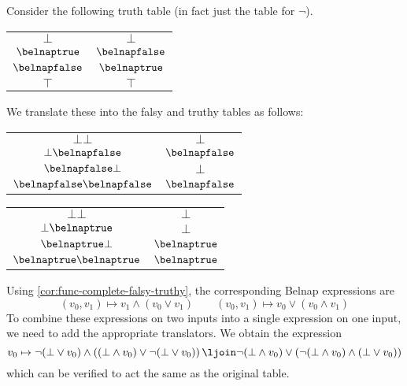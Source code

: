 \begin{example}
    Consider the following truth table (in fact just the table for \(\neg\)).
    \begin{center}
        \begin{tabular}{c|c}
            \(\bot\)         & \(\bot\)         \\
            \(\belnaptrue\)  & \(\belnapfalse\) \\
            \(\belnapfalse\) & \(\belnaptrue\)  \\
            \(\top\)         & \(\top\)
        \end{tabular}
    \end{center}
    We translate these into the falsy and truthy tables as follows:
    \begin{center}
        \begin{tabular}{c|c}
            \(\bot\bot\)                 & \(\bot\)         \\
            \(\bot\belnapfalse\)         & \(\belnapfalse\) \\
            \(\belnapfalse\bot\)         & \(\bot\)         \\
            \(\belnapfalse\belnapfalse\) & \(\belnapfalse\)
        \end{tabular}
        \begin{tabular}{c|c}
            \(\bot\bot\)               & \(\bot\)        \\
            \(\bot\belnaptrue\)        & \(\bot\)        \\
            \(\belnaptrue\bot\)        & \(\belnaptrue\) \\
            \(\belnaptrue\belnaptrue\) & \(\belnaptrue\)
        \end{tabular}
    \end{center}
    Using \cref{cor:func-complete-falsy-truthy}, the corresponding Belnap
    expressions are \[
        (v_0,v_1) \mapsto v_1 \land (v_0 \lor v_1)
        \qquad
        (v_0,v_1) \mapsto v_0 \lor (v_0 \land v_1)
    \]
    To combine these expressions on two inputs into a single expression on one
    input, we need to add the appropriate translators.
    We obtain the expression \[
        v_0 \mapsto
        \neg(\bot \lor v_0)
        \land
        \left((\bot \land v_0) \lor \neg(\bot \lor v_0)\right)
        \ljoin
        \neg(\bot \land v_0)
        \lor
        (\neg(\bot \land v_0) \land (\bot \lor v_0))
    \]
    which can be verified to act the same as the original table.
\end{example}

